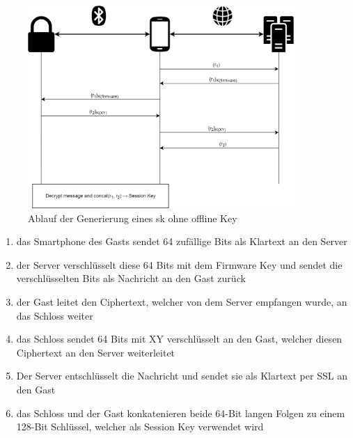         \begin{figure}[H]
    		\centering
    		\includegraphics[width=0.9\textwidth]{graphics/online_key.png}
    		\caption{Ablauf der Generierung eines \gls{sk} ohne offline Key\cite{Fuller2017}}
    		\label{fig:online_key}
    	\end{figure}
        
        \begin{enumerate}[noitemsep]
            \item das Smartphone des Gasts sendet 64 zufällige Bits als Klartext an den Server
            \item der Server verschlüsselt diese 64 Bits mit dem Firmware Key und sendet die verschlüsselten Bits als Nachricht an den Gast zurück
            \item der Gast leitet den Ciphertext, welcher von dem Server empfangen wurde, an das Schloss weiter
            \item das Schloss sendet 64 Bits mit XY verschlüsselt an den Gast, welcher diesen Ciphertext an den Server weiterleitet
            \item Der Server entschlüsselt die Nachricht und sendet sie als Klartext per SSL an den Gast
            \item das Schloss und der Gast konkatenieren beide 64-Bit langen Folgen zu einem 128-Bit Schlüssel, welcher als Session Key verwendet wird
        \end{enumerate}
